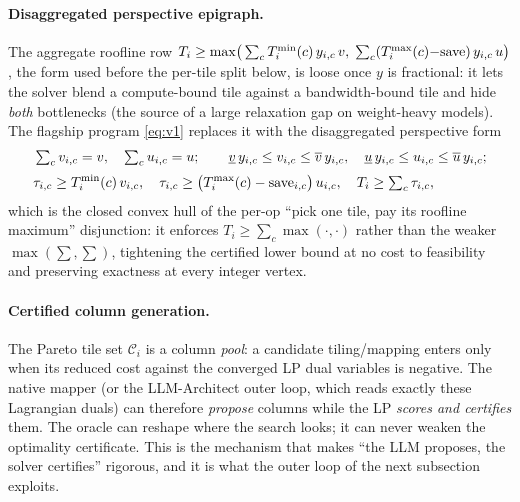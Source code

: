 \paragraph{Disaggregated perspective epigraph.}
The aggregate roofline row
$T_i \ge \max\!\big(\sum_c T^{\min}_i(c)\,y_{i,c}\,v,\; \sum_c (T^{\max}_i(c){-}\mathrm{save})\,y_{i,c}\,u\big)$,
the form used before the per-tile split below,
is loose once $y$ is fractional: it lets the solver blend a compute-bound tile
against a bandwidth-bound tile and hide \emph{both} bottlenecks
(the source of a large relaxation gap on weight-heavy models). The flagship
program \eqref{eq:v1} replaces it
with the disaggregated perspective form
\begin{equation}
\begin{aligned}
&\textstyle\sum_c v_{i,c}=v,\quad \sum_c u_{i,c}=u;\qquad
 \underline v\,y_{i,c}\le v_{i,c}\le \overline v\,y_{i,c},\quad
 \underline u\,y_{i,c}\le u_{i,c}\le \overline u\,y_{i,c};\\[2pt]
&\tau_{i,c}\ge T^{\min}_i(c)\,v_{i,c},\quad
 \tau_{i,c}\ge \big(T^{\max}_i(c)-\mathrm{save}_{i,c}\big)\,u_{i,c},\quad
 T_i\ge \textstyle\sum_c \tau_{i,c},
\end{aligned}
\label{eq:v3_epigraph}
\end{equation}
which is the closed convex hull of the per-op ``pick one tile, pay its roofline
maximum'' disjunction: it enforces $T_i \ge \sum_c \max(\cdot,\cdot)$ rather than
the weaker $\max(\sum,\sum)$, tightening the certified lower bound at no cost to
feasibility and preserving exactness at every integer vertex.

\paragraph{Certified column generation.}
The Pareto tile set $\mathcal C_i$ is a column \emph{pool}: a candidate
tiling/mapping enters only when its reduced cost against the converged LP dual
variables is negative. The native mapper (or the LLM-Architect outer loop,
which reads exactly these Lagrangian duals) can therefore \emph{propose}
columns while the LP \emph{scores and certifies} them. The oracle can reshape
where the search looks; it can never weaken the optimality certificate. This is
the mechanism that makes ``the LLM proposes, the solver certifies'' rigorous,
and it is what the outer loop of the next subsection exploits.

